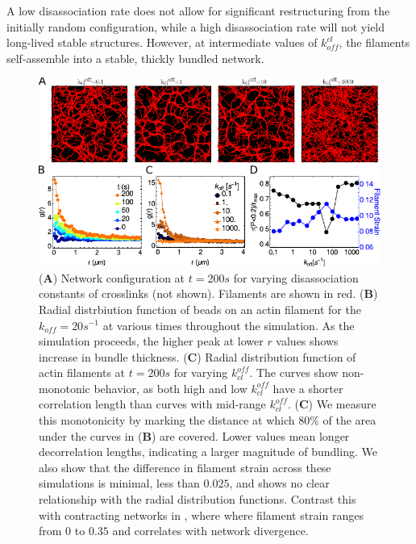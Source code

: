\documentclass[12pt]{article}
\begin{document}
A low disassociation rate does not allow for significant restructuring from the 
initially random configuration, while a high disassociation rate will not yield 
long-lived stable structures. However, at intermediate values of $k_{off}^{cl}$,
the filaments self-assemble into a stable, thickly bundled network.
\par
\begin{figure}[H] 
  \centering
  \includegraphics[scale=1.2]{figs/bundling/full_figure.pdf}
  \caption{%
  \label{fig:bundle}%
  (\textbf{A}) Network configuration at $t=200s$ for varying disassociation 
  constants of crosslinks (not shown). Filaments are shown in red. 
  (\textbf{B}) Radial distrbiution function of beads on an actin filament for 
  the $k_{off}=20 s^{-1}$ at various times throughout the simulation. As the 
  simulation proceeds, the higher peak at lower $r$ values shows increase in
  bundle thickness.
  (\textbf{C}) Radial distribution function of actin filaments at $t=200s$ for 
  varying $k_{cl}^{off}$. The curves show non-monotonic behavior, as both high
  and low $k_{cl}^{off}$ have a shorter correlation length than curves with 
  mid-range $k_{cl}^{off}$.  
  (\textbf{C}) We measure this monotonicity by marking the distance at which 
  $80\%$ of the area under the curves in (\textbf{B}) are covered. Lower values
  mean longer decorrelation lengths, indicating a larger magnitude of bundling.
  We also show that the difference in filament strain across these simulations
  is minimal, less than $0.025$, and shows no clear relationship with the radial
  distribution functions. Contrast this with contracting networks in
  , where where filament strain ranges from $0$ to $0.35$ and
  correlates with network divergence.  
}
\end{figure}
\end{document}
